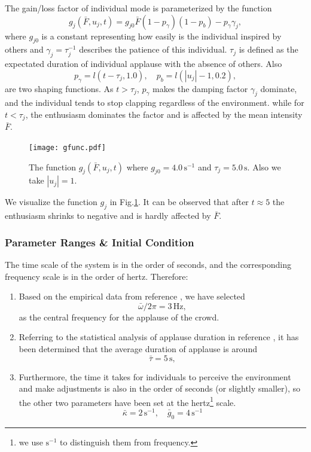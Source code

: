 \documentclass[UTF8,a4paper,11pt]{ctexart}
\begin{document}
The gain/loss factor of individual mode is parameterized by the function
\begin{equation}
    g_j(\bar{F}, u_j, t) = g_{j0} \bar{F} (1-p_γ)(1-p_b) - p_γ γ_j,
\end{equation}
where $g_{j0}$ is a constant representing how easily is the individual inspired by others and $γ_j = τ_j^{-1}$ describes the patience of this individual. $τ_j$ is defined as the expectated duration of individual applause with the absence of others. Also
\begin{equation}
    p_γ = l(t-τ_j,1.0), \quad p_b = l(|u_j|-1,0.2),
\end{equation}
are two shaping functions. As $t>τ_j$, $p_γ$ makes the damping factor $γ_j$ dominate, and the individual tends to stop clapping regardless of the environment. while for $t<τ_j$, the enthusiasm dominates the factor and is affected by the mean intensity $\bar{F}$.

\begin{figure}[H]
    \centering
    \texttt{[image: gfunc.pdf]}
    \caption{The function $g_j(\bar{F},u_j,t)$ where $g_{j0}=4.0\,\mathrm{s^{-1}}$ and $τ_j=5.0 \,\mathrm{s}$. Also we take $|u_j|=1$.}
    \label{fig:gfunc}
\end{figure}

We visualize the function $g_j$ in Fig.\ref{fig:gfunc}. It can be observed that after $t≈5$ the enthusiasm shrinks to negative and is hardly affected by $\bar{F}$.

\subsubsection{Parameter Ranges \& Initial Condition}

The time scale of the system is in the order of seconds, and the corresponding frequency scale is in the order of hertz. Therefore: 
\begin{enumerate}
    \item Based on the empirical data from reference \cite{appPRE,neda2000sound}, we have selected
    \begin{equation*}
        \bar{ω}/2π = 3\,\mathrm{Hz},
    \end{equation*}
    as the central frequency for the applause of the crowd.
    \item Referring to the statistical analysis of applause duration in reference \cite{mann2013dynamics}, it has been determined that the average duration of applause is around
    \begin{equation*}
        \bar{τ} = 5\,\mathrm{s},
    \end{equation*}
    \item Furthermore, the time it takes for individuals to perceive the environment and make adjustments is also in the order of seconds (or slightly smaller), so the other two parameters have been set at the hertz\footnote{we use $\mathrm{s^{-1}}$ to distinguish them from frequency.} scale.
    \begin{equation*}
        \bar{κ} = 2\,\mathrm{s^{-1}},\quad \bar{g}_{0} = 4\,\mathrm{s^{-1}}
    \end{equation*}
\end{enumerate}
\end{document}
